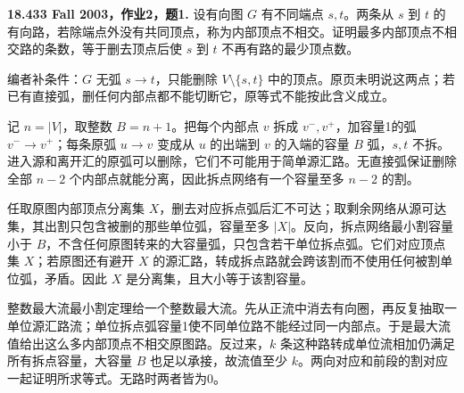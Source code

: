 \begin{exercise}\label{mit:18433-a2-q1}
\textbf{18.433 Fall 2003，作业2，题1.}
设有向图 $G$ 有不同端点 $s,t$。两条从 $s$ 到 $t$ 的有向路，若除端点外没有共同顶点，称为内部顶点不相交。证明最多内部顶点不相交路的条数，等于删去顶点后使 $s$ 到 $t$ 不再有路的最少顶点数。

编者补条件：$G$ 无弧 $s\to t$，只能删除 $V\setminus\{s,t\}$ 中的顶点。原页未明说这两点；若已有直接弧，删任何内部点都不能切断它，原等式不能按此含义成立。
\end{exercise}
\begin{solution}
记 $n=|V|$，取整数 $B=n+1$。把每个内部点 $v$ 拆成 $v^-,v^+$，加容量1的弧 $v^-\to v^+$；每条原弧 $u\to v$ 变成从 $u$ 的出端到 $v$ 的入端的容量 $B$ 弧，$s,t$ 不拆。进入源和离开汇的原弧可以删除，它们不可能用于简单源汇路。无直接弧保证删除全部 $n-2$ 个内部点就能分离，因此拆点网络有一个容量至多 $n-2$ 的割。

任取原图内部顶点分离集 $X$，删去对应拆点弧后汇不可达；取剩余网络从源可达集，其出割只包含被删的那些单位弧，容量至多 $|X|$。反向，拆点网络最小割容量小于 $B$，不含任何原图转来的大容量弧，只包含若干单位拆点弧。它们对应顶点集 $X$；若原图还有避开 $X$ 的源汇路，转成拆点路就会跨该割而不使用任何被割单位弧，矛盾。因此 $X$ 是分离集，且大小等于该割容量。

整数最大流最小割定理给一个整数最大流。先从正流中消去有向圈，再反复抽取一单位源汇路流；单位拆点弧容量1使不同单位路不能经过同一内部点。于是最大流值给出这么多内部顶点不相交原图路。反过来，$k$ 条这种路转成单位流相加仍满足所有拆点容量，大容量 $B$ 也足以承接，故流值至少 $k$。两向对应和前段的割对应一起证明所求等式。无路时两者皆为0。
\end{solution}

